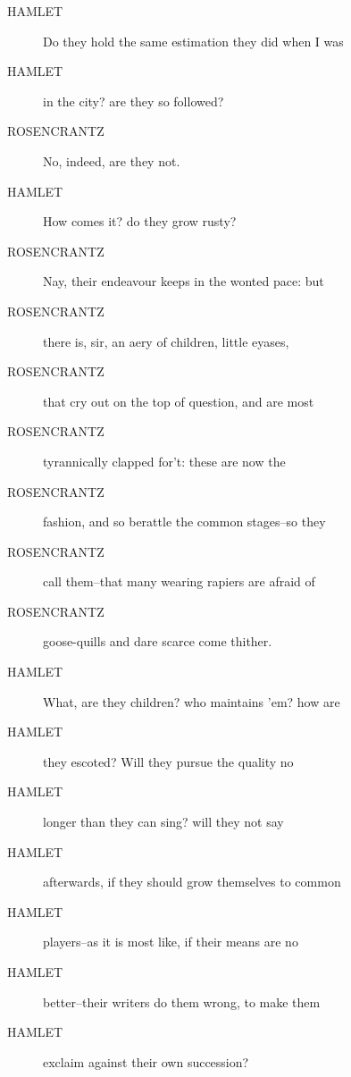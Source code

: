 \documentclass{article}
\begin{document}
\begin{description}
            
\item[HAMLET] Do they hold the same estimation they did when I was
\item[HAMLET] in the city? are they so followed?
\end{description}
          
\begin{description}
            
\item[ROSENCRANTZ] No, indeed, are they not.
\end{description}
          
\begin{description}
            
\item[HAMLET] How comes it? do they grow rusty?
\end{description}
          
\begin{description}
            
\item[ROSENCRANTZ] Nay, their endeavour keeps in the wonted pace: but
\item[ROSENCRANTZ] there is, sir, an aery of children, little eyases,
\item[ROSENCRANTZ] that cry out on the top of question, and are most
\item[ROSENCRANTZ] tyrannically clapped for't: these are now the
\item[ROSENCRANTZ] fashion, and so berattle the common stages--so they
\item[ROSENCRANTZ] call them--that many wearing rapiers are afraid of
\item[ROSENCRANTZ] goose-quills and dare scarce come thither.
\end{description}
          
\begin{description}
            
\item[HAMLET] What, are they children? who maintains 'em? how are
\item[HAMLET] they escoted? Will they pursue the quality no
\item[HAMLET] longer than they can sing? will they not say
\item[HAMLET] afterwards, if they should grow themselves to common
\item[HAMLET] players--as it is most like, if their means are no
\item[HAMLET] better--their writers do them wrong, to make them
\item[HAMLET] exclaim against their own succession?
\end{description}
          
\end{document}
